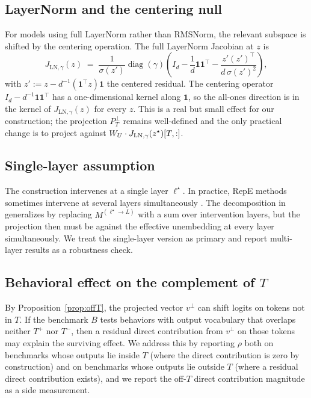 \documentclass[11pt,letterpaper]{article}
\theoremstyle{plain}
\theoremstyle{definition}
\DeclareMathOperator{\diag}{diag}
\newcommand{\1}{\mathbf{1}}
\newcommand{\WU}{W_{U}\mathchoice{}{}{}{}}
\newcommand{\vperp}{v^{\perp}}
\newcommand{\PTperp}{P_{T}^{\perp}}
\begin{document}
\subsection{LayerNorm and the centering null}

For models using full LayerNorm rather than RMSNorm, the relevant subspace is shifted by the centering operation. The full LayerNorm Jacobian at $z$ is
\begin{equation}
J_{\text{LN}, \gamma}(z) \;=\; \frac{1}{\sigma(z')}\diag(\gamma)\left(I_d - \frac{1}{d}\1\1^\top - \frac{z'(z')^\top}{d\,\sigma(z')^2}\right),
\label{eq:lnjacobian}
\end{equation}
with $z' := z - d^{-1}(\1^\top z)\1$ the centered residual. The centering operator $I_d - d^{-1}\1\1^\top$ has a one-dimensional kernel along $\1$, so the all-ones direction is in the kernel of $J_{\text{LN}, \gamma}(z)$ for every $z$. This is a real but small effect for our construction; the projection $\PTperp$ remains well-defined and the only practical change is to project against $\WU \cdot J_{\text{LN}, \gamma}(z^\star)[T,:]$.

\subsection{Single-layer assumption}

The construction intervenes at a single layer $\ell^\star$. In practice, RepE methods sometimes intervene at several layers simultaneously \cite{zou2023repe}. The decomposition in  generalizes by replacing $M^{(\ell^\star \to L)}$ with a sum over intervention layers, but the projection then must be against the effective unembedding at every layer simultaneously. We treat the single-layer version as primary and report multi-layer results as a robustness check.

\subsection{Behavioral effect on the complement of $T$}

By Proposition~\ref{prop:offT}, the projected vector $\vperp$ can shift logits on tokens not in $T$. If the benchmark $B$ tests behaviors with output vocabulary that overlaps neither $T^+$ nor $T^-$, then a residual direct contribution from $\vperp$ on those tokens may explain the surviving effect. We address this by reporting $\rho$ both on benchmarks whose outputs lie inside $T$ (where the direct contribution is zero by construction) and on benchmarks whose outputs lie outside $T$ (where a residual direct contribution exists), and we report the off-$T$ direct contribution magnitude as a side measurement.
\end{document}
